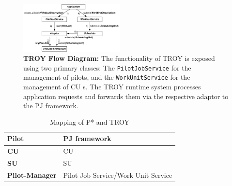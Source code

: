\documentclass[conference,final]{IEEEtran}
\newcommand{\alnote}[1]{ {\textcolor{blue} { ***andre: #1 }}}
\newcommand{\alnote}[1]{}
\newcommand{\cu}{CU\xspace}
\newcommand{\upp}{\vspace*{-0.5em}}
\begin{document}







\begin{figure}[t]
	\centering
		\includegraphics[width=0.47\textwidth]{figures/troy_flow.pdf}
	\caption{\textbf{TROY Flow Diagram:} The functionality of TROY is exposed 
	using two primary classes: The \texttt{PilotJobService} for the management 
	of pilots, and the \texttt{WorkUnitService} for the management of \cu s. The 
	TROY runtime system processes application requests and forwards them via the 
	respective adaptor to the PJ framework.
	}
	\label{fig:figures_troy_flow}
\end{figure}

\begin{table}[t]
	\centering
\begin{tabular}{|l|l|}
\hline
\textbf{Pilot} &PJ framework\\
\hline
\textbf{\cu } &\cu \\
\hline
\textbf{SU} &SU\\
\hline
\textbf{Pilot-Manager} & Pilot Job Service/Work Unit Service\\
\hline
\end{tabular}
\caption{Mapping of P* and TROY\upp\upp}\label{table:pstar_elements}
\end{table}
\end{document}
